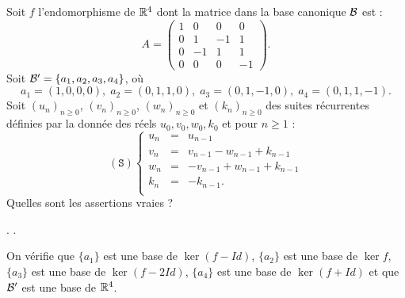 \begin{question}
Soit $f$ l'endomorphisme de $\mathbb{R}^4$ dont la matrice dans la base canonique  ${\cal B}$ est  : 
$$A=\left(\begin{array}{rccc}1&0&0&0\\
0&1&-1&1\\ 0&-1&1&1\\0&0&0&-1\end{array}\right).$$
Soit ${\cal B}' = \{ a_1, a_2,  a_3, a_4\}$, où 
$$a_1=(1,0,0,0),\; a_2=(0,1,1,0),\; a_3=(0,1,-1,0),\; a_4=(0,1,1,-1).$$
Soit $(u_n)_{n\ge 0}$, $(v_n)_{n\ge 0}$, $(w_n)_{n\ge 0}$ et $(k_n)_{n\ge 0}$ des suites récurrentes définies par la donnée
des réels $u_0, v_0,w_0,k_0$ et pour $n\ge 1$ :
$$(\mathtt{S})  
\left\{\begin{array}{rcc}
u_n&=&u_{n-1}\\
v_n&=&v_{n-1}-w_{n-1}+k_{n-1}\\ 
w_n&=& -v_{n-1}+w_{n-1}+k_{n-1}\\
k_n&=&-k_{n-1}.\\
\end{array}\right.$$
Quelles sont les assertions vraies ?  
\begin{answers}  
.
.
\end{answers}
\begin{explanations} On vérifie que 
$\{a_1\}$ est une base de $\ker (f-Id)$,  $\{a_2\}$ est une base de $\ker f$, $\{a_3 \}$ est une base de $\ker (f-2Id)$,   $\{a_4\}$ est une base de $\ker (f+Id)$ et que ${\cal B}'$ est une base de $\mathbb{R}^4$.

\end{explanations}
\end{question}
